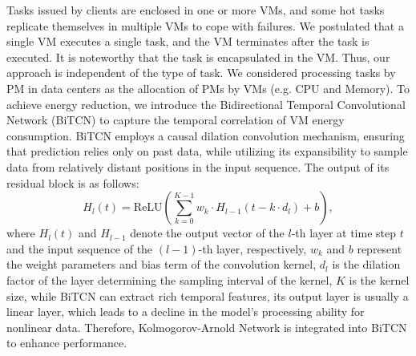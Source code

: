 \documentclass[conference]{{IEEEtran}}
\begin{document}
Tasks issued by clients are enclosed in one or more VMs, and some hot tasks replicate themselves in multiple VMs to cope with failures. We postulated that a single VM executes a single task, and the VM terminates after the task is executed. It is noteworthy that the task is encapsulated in the VM. Thus, our approach is independent of the type of task. We considered processing tasks by PM in data centers as the allocation of PMs by VMs (e.g. CPU and Memory). To achieve energy reduction, we introduce the Bidirectional Temporal Convolutional Network (BiTCN) to capture the temporal correlation of VM energy consumption. BiTCN employs a causal dilation convolution mechanism, ensuring that prediction relies only on past data, while utilizing its expansibility to sample data from relatively distant positions in the input sequence. The output of its residual block is as follows:
\begin{equation}
    H_l(t) = \text{ReLU}\left( \sum_{k=0}^{K-1} w_k \cdot H_{l-1}(t - k \cdot d_l) + b \right),
    \label{eq:dilated_conv}
\end{equation}
where $H_l(t)$ and $H_{l-1}$ denote the output vector of the $l$-th layer at time step $t$ and the input sequence of the $(l-1)$-th layer, respectively,  $w_k$ and $b$ represent the weight parameters and bias term of the convolution kernel,  $d_l$ is the dilation factor of the layer determining the sampling interval of the kernel,  $K$ is the kernel size, while BiTCN can extract rich temporal features, its output layer is usually a linear layer, which leads to a decline in the model's processing ability for nonlinear data. Therefore, Kolmogorov-Arnold Network is integrated into BiTCN to enhance performance.
\end{document}
